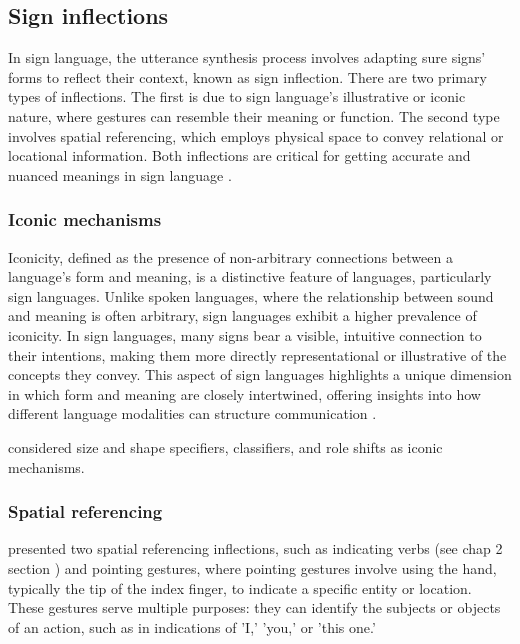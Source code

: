 \subsection{Sign inflections}

In sign language, the utterance synthesis process involves adapting sure signs' forms to reflect their context, known as sign inflection. There are two primary types of inflections. The first is due to sign language's illustrative or iconic nature, where gestures can resemble their meaning or function. The second type involves spatial referencing, which employs physical space to convey relational or locational information. Both inflections are critical for getting accurate and nuanced meanings in sign language \parencite{naert2020survey}.

\subsubsection{Iconic mechanisms}

Iconicity, defined as the presence of non-arbitrary connections between a language's form and meaning, is a distinctive feature of languages, particularly sign languages. Unlike spoken languages, where the relationship between sound and meaning is often arbitrary, sign languages exhibit a higher prevalence of iconicity. In sign languages, many signs bear a visible, intuitive connection to their intentions, making them more directly representational or illustrative of the concepts they convey. This aspect of sign languages highlights a unique dimension in which form and meaning are closely intertwined, offering insights into how different language modalities can structure communication \parencite{iconicityperlman}.

\textcite{naert2020survey} considered size and shape specifiers, classifiers, and role shifts as iconic mechanisms. 

\subsubsection{Spatial referencing}

\textcite{naert2020survey} presented two spatial referencing inflections, such as indicating verbs (see chap 2 section ) and pointing gestures, where pointing gestures involve using the hand, typically the tip of the index finger, to indicate a specific entity or location. These gestures serve multiple purposes: they can identify the subjects or objects of an action, such as in indications of 'I,' 'you,' or 'this one.'

